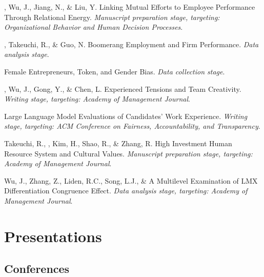 \begin{entries}
    \entn{}, Wu, J., Jiang, N., \& Liu, Y. Linking Mutual Efforts to Employee Performance Through Relational Energy. \textit{Manuscript preparation stage, targeting: Organizational Behavior and Human Decision Processes}.

    \entn{}, Takeuchi, R., \& Guo, N. Boomerang Employment and Firm Performance. \textit{Data analysis stage}.

    \entn{} Female Entrepreneurs, Token, and Gender Bias. \textit{Data collection stage}.

    \entn{}\eqc, Wu, J.\eqc, Gong, Y., \& Chen, L. Experienced Tensions and Team Creativity. \textit{Writing stage, targeting: Academy of Management Journal}.

    \entn{} Large Language Model Evaluations of Candidates' Work Experience. \textit{Writing stage, targeting: ACM Conference on Fairness, Accountability, and Transparency}.

    \entn{}Takeuchi, R., , Kim, H., Shao, R., \& Zhang, R. High Investment Human Resource System and Cultural Values. \textit{Manuscript preparation stage, targeting: Academy of Management Journal}.

    \entn{}Wu, J., Zhang, Z., Liden, R.C., Song, L.J., \&  A Multilevel Examination of LMX Differentiation Congruence Effect. \textit{Data analysis stage, targeting: Academy of Management Journal}.

\end{entries}
\fi


\ifcvmedium
\section*{Presentations}

\subsection*{Conferences}


